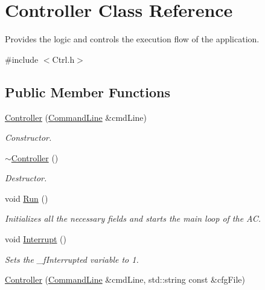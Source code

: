 \hypertarget{class_controller}{\section{Controller Class Reference}
\label{class_controller}
}


Provides the logic and controls the execution flow of the application.  




{\ttfamily \#include $<$Ctrl.\-h$>$}

\subsection*{Public Member Functions}
\begin{DoxyCompactItemize}
\item 
\hyperlink{class_controller_a43e23ba480023bc5066c0f80f8c964bd}{Controller} (\hyperlink{class_command_line}{Command\-Line} \&cmd\-Line)
\begin{DoxyCompactList}\small\item\em Constructor. \end{DoxyCompactList}\item 
\hypertarget{class_controller_a0ab87934c4f7a266cfdb86e0f36bc1b5}{\hyperlink{class_controller_a0ab87934c4f7a266cfdb86e0f36bc1b5}{$\sim$\-Controller} ()}\label{class_controller_a0ab87934c4f7a266cfdb86e0f36bc1b5}

\begin{DoxyCompactList}\small\item\em Destructor. \end{DoxyCompactList}\item 
void \hyperlink{class_controller_a17abb2cec6c0109e9b2df3cdc082eaad}{Run} ()
\begin{DoxyCompactList}\small\item\em Initializes all the necessary fields and starts the main loop of the A\-C. \end{DoxyCompactList}\item 
\hypertarget{class_controller_a4bb78bf21b480dce2e726c92ccc125f7}{void \hyperlink{class_controller_a4bb78bf21b480dce2e726c92ccc125f7}{Interrupt} ()}\label{class_controller_a4bb78bf21b480dce2e726c92ccc125f7}

\begin{DoxyCompactList}\small\item\em Sets the \-\_\-f\-Interrupted variable to 1. \end{DoxyCompactList}\item 
\hypertarget{class_controller_a89f48ed959f8719dab032cc0b7cd5718}{\hyperlink{class_controller_a89f48ed959f8719dab032cc0b7cd5718}{Controller} (\hyperlink{class_command_line}{Command\-Line} \&cmd\-Line, std\-::string const \&cfg\-File)}\label{class_controller_a89f48ed959f8719dab032cc0b7cd5718}


\end{DoxyCompactItemize}
